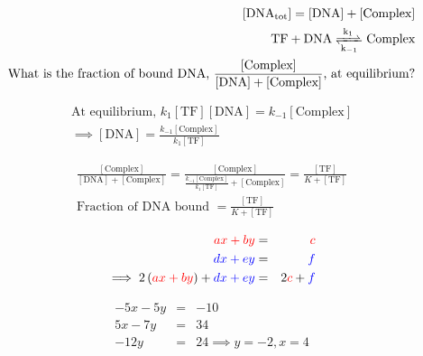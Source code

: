 \documentclass{article}
\begin{document}
\begin{eqnarray*}
\left[ \textrm{DNA}_{\textrm{tot}} \right] = \left[ \textrm{DNA} \right] + \left[ \textrm{Complex} \right]\\
\ce{\textrm{TF} + \textrm{DNA} <=>[k_1][k_{-1}]  \textrm{Complex} }\\
\textrm{What is the fraction of bound DNA, } \frac{ \left[ \textrm{Complex} \right]}{\left[ \textrm{DNA} \right] + \left[ \textrm{Complex} \right]} \textrm{, at equilibrium?}
\end{eqnarray*}

\begin{eqnarray*}
\textrm{At equilibrium, } k_1 \left[ \textrm{TF} \right] \left[ \textrm{DNA} \right] = k_{-1} \left[ \textrm{Complex} \right]\\ \implies \left[ \textrm{DNA} \right] = \frac{k_{-1} \left[ \textrm{Complex} \right]}{k_{1} \left[ \textrm{TF} \right]} 
\end{eqnarray*}

\begin{eqnarray*}
\frac{ \left[ \textrm{Complex} \right]}{ \left[ \textrm{DNA} \right] + \left[ \textrm{Complex} \right]}  = \frac{ \left[ \textrm{Complex} \right]}{ \frac{k_{-1} \left[ \textrm{Complex} \right]}{k_{1} \left[ \textrm{TF} \right]} + \left[ \textrm{Complex} \right]} = \frac{ \left[ \textrm{TF} \right]}{ K + \left[ \textrm{TF} \right]} \\
\textrm{Fraction of DNA bound } = \frac{ \left[ \textrm{TF} \right]}{ K + \left[ \textrm{TF} \right]} 
\end{eqnarray*}

\begin{eqnarray*}
{\color{red} a x + by}  & = & {\color{red} c }\\
{\color{blue} d x + ey} & = & {\color{blue} f}\\
\implies 2 \left( {\color{red} a x + by} \right) + {\color{blue} d x + ey} & = & 2{\color{red} c } + {\color{blue} f}
\end{eqnarray*}

\begin{eqnarray*}
-5x -5 y & = & -10\\
5x - 7 y & = & 34\\
-12 y & = & 24 \implies y = -2, x=4
\end{eqnarray*}
\end{document}
